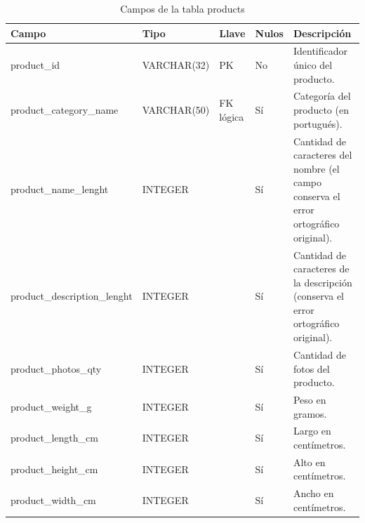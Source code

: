\documentclass[a4paper,stu,12pt,donotrepeattitle,floatsintext]{apa7}
\begin{document}
{\footnotesize
\begin{longtable}{|>{\raggedright\arraybackslash}p{}|>{\raggedright\arraybackslash}p{}|>{\raggedright\arraybackslash}p{}|>{\raggedright\arraybackslash}p{}|>{\raggedright\arraybackslash}p{}|}
\caption{Campos de la tabla products}\\
\hline
\textbf{Campo} & \textbf{Tipo} & \textbf{Llave} & \textbf{Nulos} & \textbf{Descripción} \\ \hline
\endhead
product\_\allowbreak{}id & VARCHAR(32) & PK & No & Identificador único del producto. \\ \hline
product\_\allowbreak{}category\_\allowbreak{}name & VARCHAR(50) & FK lógica & Sí & Categoría del producto (en portugués). \\ \hline
product\_\allowbreak{}name\_\allowbreak{}lenght & INTEGER &  & Sí & Cantidad de caracteres del nombre (el campo conserva el error ortográfico original). \\ \hline
product\_\allowbreak{}description\_\allowbreak{}lenght & INTEGER &  & Sí & Cantidad de caracteres de la descripción (conserva el error ortográfico original). \\ \hline
product\_\allowbreak{}photos\_\allowbreak{}qty & INTEGER &  & Sí & Cantidad de fotos del producto. \\ \hline
product\_\allowbreak{}weight\_\allowbreak{}g & INTEGER &  & Sí & Peso en gramos. \\ \hline
product\_\allowbreak{}length\_\allowbreak{}cm & INTEGER &  & Sí & Largo en centímetros. \\ \hline
product\_\allowbreak{}height\_\allowbreak{}cm & INTEGER &  & Sí & Alto en centímetros. \\ \hline
product\_\allowbreak{}width\_\allowbreak{}cm & INTEGER &  & Sí & Ancho en centímetros. \\ \hline
\end{longtable}
}
\end{document}
